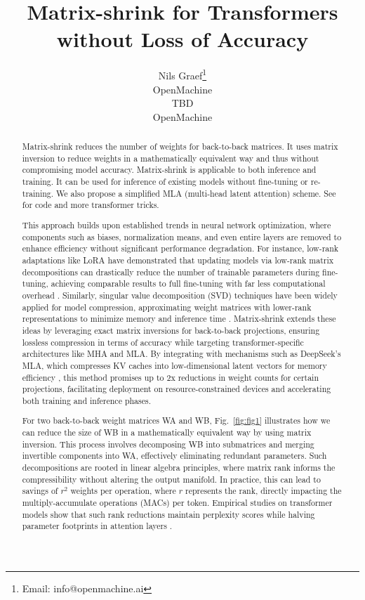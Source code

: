 \documentclass{article}
\title{Matrix-shrink for Transformers without Loss of Accuracy}
\author{
  Nils Graef\thanks{Email: info@openmachine.ai} \\
  OpenMachine \\
  \And
  TBD \\
  OpenMachine
}
\begin{document}
\maketitle

\begin{abstract}
Matrix-shrink reduces the number of weights for back-to-back matrices. It uses matrix inversion to reduce weights in a mathematically equivalent way and thus without compromising model accuracy. Matrix-shrink is applicable to both inference and training. It can be used for inference of existing models without fine-tuning or re-training. We also propose a simplified MLA (multi-head latent attention) scheme. See \cite{openmachine2024} for code and more transformer tricks.

This approach builds upon established trends in neural network optimization, where components such as biases, normalization means, and even entire layers are removed to enhance efficiency without significant performance degradation. For instance, low-rank adaptations like LoRA have demonstrated that updating models via low-rank matrix decompositions can drastically reduce the number of trainable parameters during fine-tuning, achieving comparable results to full fine-tuning with far less computational overhead \cite{medium2025lora}. Similarly, singular value decomposition (SVD) techniques have been widely applied for model compression, approximating weight matrices with lower-rank representations to minimize memory and inference time \cite{lesswrong2022svd}. Matrix-shrink extends these ideas by leveraging exact matrix inversions for back-to-back projections, ensuring lossless compression in terms of accuracy while targeting transformer-specific architectures like MHA and MLA. By integrating with mechanisms such as DeepSeek's MLA, which compresses KV caches into low-dimensional latent vectors for memory efficiency \cite{deepseek2024}, this method promises up to 2x reductions in weight counts for certain projections, facilitating deployment on resource-constrained devices and accelerating both training and inference phases.

For two back-to-back weight matrices WA and WB, Fig.~\ref{fig:fig1} illustrates how we can reduce the size of WB in a mathematically equivalent way by using matrix inversion. This process involves decomposing WB into submatrices and merging invertible components into WA, effectively eliminating redundant parameters. Such decompositions are rooted in linear algebra principles, where matrix rank informs the compressibility without altering the output manifold. In practice, this can lead to savings of $r^{2}$ weights per operation, where $r$ represents the rank, directly impacting the multiply-accumulate operations (MACs) per token. Empirical studies on transformer models show that such rank reductions maintain perplexity scores while halving parameter footprints in attention layers \cite{arxiv2024feature}.
\end{abstract}
\end{document}
